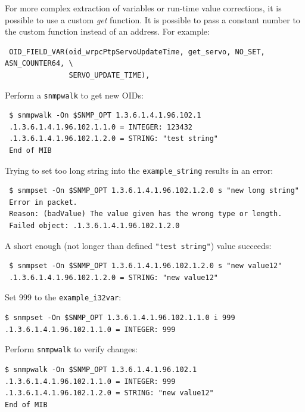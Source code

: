 \documentclass[a4paper, 12pt]{article}
\begin{document}
\begin{itemize*}
For more complex extraction of variables or run-time value corrections,
it is possible to use a custom \textit{get} function. It is possible to pass
a constant number to the custom function instead of an address. For example:
\begin{lstlisting}
 OID_FIELD_VAR(oid_wrpcPtpServoUpdateTime, get_servo, NO_SET, ASN_COUNTER64, \
               SERVO_UPDATE_TIME),
\end{lstlisting}

\end{itemize*}
Perform a \texttt{snmpwalk} to get new OIDs:
\begin{lstlisting}
 $ snmpwalk -On $SNMP_OPT 1.3.6.1.4.1.96.102.1
 .1.3.6.1.4.1.96.102.1.1.0 = INTEGER: 123432
 .1.3.6.1.4.1.96.102.1.2.0 = STRING: "test string"
 End of MIB
\end{lstlisting}
Trying to set too long string into the \texttt{example\_string} results in an error:
\begin{lstlisting}
 $ snmpset -On $SNMP_OPT 1.3.6.1.4.1.96.102.1.2.0 s "new long string"
 Error in packet.
 Reason: (badValue) The value given has the wrong type or length.
 Failed object: .1.3.6.1.4.1.96.102.1.2.0
\end{lstlisting}
A short enough (not longer than defined \texttt{"test string"}) value succeeds:
\begin{lstlisting}
 $ snmpset -On $SNMP_OPT 1.3.6.1.4.1.96.102.1.2.0 s "new value12"
 .1.3.6.1.4.1.96.102.1.2.0 = STRING: "new value12"
\end{lstlisting}
Set 999 to the \texttt{example\_i32var}:
\begin{lstlisting}
$ snmpset -On $SNMP_OPT 1.3.6.1.4.1.96.102.1.1.0 i 999
.1.3.6.1.4.1.96.102.1.1.0 = INTEGER: 999
\end{lstlisting}
Perform \texttt{snmpwalk} to verify changes:
\begin{lstlisting}
$ snmpwalk -On $SNMP_OPT 1.3.6.1.4.1.96.102.1
.1.3.6.1.4.1.96.102.1.1.0 = INTEGER: 999
.1.3.6.1.4.1.96.102.1.2.0 = STRING: "new value12"
End of MIB
\end{lstlisting}
\end{document}

